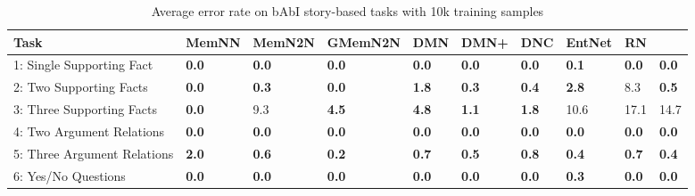 \documentclass[twoside,ms]{snuthesis_utf8}
\begin{document}
\clearpage
\begin{table}[h]
\centering
	\caption{Average error rate on bAbI story-based tasks with 10k training samples}
	\label{table:babi_result}
\begin{adjustbox}{max width=0.95\textwidth}
\begin{tabular}{l|llllllll>{\columncolor[gray]{0.8}}l}
\hline
Task                                 & \multicolumn{1}{c}{MemNN} & \multicolumn{1}{c}{MemN2N} & \multicolumn{1}{c}{GMemN2N} & \multicolumn{1}{c}{DMN} & \multicolumn{1}{c}{DMN+} & \multicolumn{1}{c}{DNC} & \multicolumn{1}{c}{EntNet\footnotemark}& \multicolumn{1}{c}{RN\footnotemark} & \multicolumn{1}{c}{RMN} \\ \hline
1: Single Supporting Fact            & \textbf{0.0}                       & \textbf{0.0}                        & \textbf{0.0} & \textbf{0.0}                     & \textbf{0.0}                      & \textbf{0.0}                     & \textbf{0.1}                        & \textbf{0.0}                    & \textbf{0.0}                     \\
2: Two Supporting Facts              & \textbf{0.0}                       & \textbf{0.3}                        & \textbf{0.0}                         & \textbf{1.8}                     & \textbf{0.3}                      & \textbf{0.4}                     & \textbf{2.8} & 8.3                    & \textbf{0.5}                     \\
3: Three Supporting Facts            & \textbf{0.0}                       & 9.3                        & \textbf{4.5                        } & \textbf{4.8}                     & \textbf{1.1}                      & \textbf{1.8}                     & 10.6                       & 17.1                  & 14.7                     \\
4: Two Argument Relations            & \textbf{0.0}                       & \textbf{0.0}                        & \textbf{0.0} & \textbf{0.0}                     & \textbf{0.0}                    & \textbf{0.0}                    & \textbf{0.0} & \textbf{0.0}                    & \textbf{0.0}                   \\
5: Three Argument Relations          & \textbf{2.0 }                      & \textbf{0.6}                        & \textbf{0.2 } & \textbf{0.7}                     & \textbf{0.5}                     &\textbf{0.8}                     &\textbf{0.4}                       & \textbf{0.7}                   & \textbf{0.4}                     \\
6: Yes/No Questions                  & \textbf{0.0}                       & \textbf{0.0}                        & \textbf{0.0} & \textbf{0.0}                     & \textbf{0.0}                      & \textbf{0.0}                     & \textbf{0.3}                       & \textbf{0.0}                    & \textbf{0.0}                     \\

\end{tabular}
\end{adjustbox}
\end{table}
\end{document}
